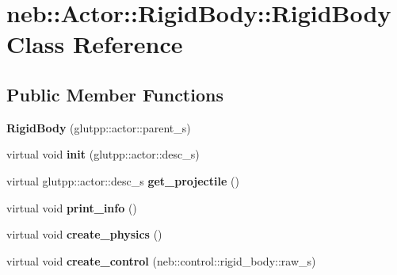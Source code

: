 \hypertarget{classneb_1_1Actor_1_1RigidBody_1_1RigidBody}{
\section{neb::Actor::RigidBody::RigidBody Class Reference}
\label{classneb_1_1Actor_1_1RigidBody_1_1RigidBody}
}
\subsection*{Public Member Functions}
\begin{DoxyCompactItemize}
\item 
\hypertarget{classneb_1_1Actor_1_1RigidBody_1_1RigidBody_a4a42b50cdc34ed40704fe68a6044aac5}{
{\bfseries RigidBody} (glutpp::actor::parent\_\-s)}
\label{classneb_1_1Actor_1_1RigidBody_1_1RigidBody_a4a42b50cdc34ed40704fe68a6044aac5}

\item 
\hypertarget{classneb_1_1Actor_1_1RigidBody_1_1RigidBody_a49bc7986eea3d48486dc8bdba8b84954}{
virtual void {\bfseries init} (glutpp::actor::desc\_\-s)}
\label{classneb_1_1Actor_1_1RigidBody_1_1RigidBody_a49bc7986eea3d48486dc8bdba8b84954}

\item 
\hypertarget{classneb_1_1Actor_1_1RigidBody_1_1RigidBody_af9d4be08596daf414fc020ac6c659a6e}{
virtual glutpp::actor::desc\_\-s {\bfseries get\_\-projectile} ()}
\label{classneb_1_1Actor_1_1RigidBody_1_1RigidBody_af9d4be08596daf414fc020ac6c659a6e}

\item 
\hypertarget{classneb_1_1Actor_1_1RigidBody_1_1RigidBody_a113a8004e1564ce207c89101bb015086}{
virtual void {\bfseries print\_\-info} ()}
\label{classneb_1_1Actor_1_1RigidBody_1_1RigidBody_a113a8004e1564ce207c89101bb015086}

\item 
\hypertarget{classneb_1_1Actor_1_1RigidBody_1_1RigidBody_a690d134f35e34636883622d13596592c}{
virtual void {\bfseries create\_\-physics} ()}
\label{classneb_1_1Actor_1_1RigidBody_1_1RigidBody_a690d134f35e34636883622d13596592c}

\item 
\hypertarget{classneb_1_1Actor_1_1RigidBody_1_1RigidBody_a5217679a926c4bdbd9006545751c39ac}{
virtual void {\bfseries create\_\-control} (neb::control::rigid\_\-body::raw\_\-s)}
\label{classneb_1_1Actor_1_1RigidBody_1_1RigidBody_a5217679a926c4bdbd9006545751c39ac}

\end{DoxyCompactItemize}

